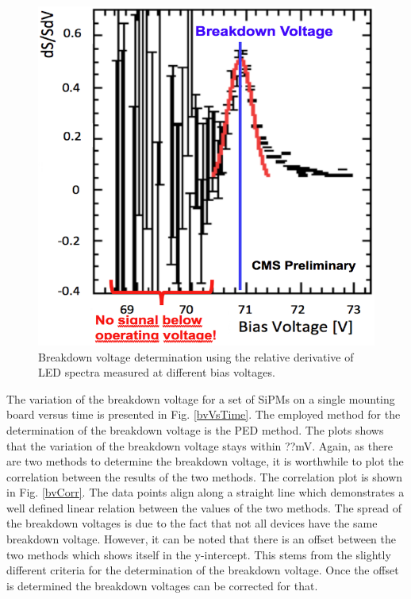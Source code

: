 \begin{figure}[h]
\centering
\begin{minipage}[t]{0.475\textwidth}
\includegraphics[width=\textwidth]{Bilder/bvLedScaled.png}
\caption{Breakdown voltage determination using the relative derivative of LED spectra measured at different bias voltages.}
\label{bvLed}
\end{minipage}
\hspace{0.5cm}
\begin{minipage}[t]{0.475\textwidth}

\end{minipage}
\end{figure}
The variation of the breakdown voltage for a set of SiPMs on a single mounting board versus time is presented in Fig. \ref{bvVsTime}. The employed method for the determination of the breakdown voltage is the PED method. The plots shows that the variation of the breakdown voltage stays within ??mV.
Again, as there are two methods to determine the breakdown voltage, it is worthwhile to plot the correlation between the results of the two methods. The correlation plot is shown in Fig. \ref{bvCorr}. The data points align along a straight line which demonstrates a well defined linear relation between the values of the two methods. The spread of the breakdown voltages is due to the fact that not all devices have the same breakdown voltage. However, it can be noted that there is an offset between the two methods which shows itself in the y-intercept. This stems from the slightly different criteria for the determination of the breakdown voltage. Once the offset is determined the breakdown voltages can be corrected for that.